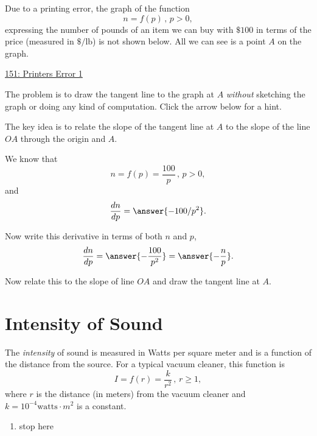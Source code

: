 \documentclass{ximera}
\begin{document}
\begin{question} \label{QGETGG3fg44}
Due to a printing error, the graph of the function
\[
      n = f(p)  \, , \, p>0 ,
\]
expressing the number of pounds of an item we can buy with $\$100$ in terms of the price (measured in $\$/\text{lb}$) is not shown below. All we can see is a point $A$ on the graph.

\begin{onlineOnly}
    \begin{center}
\end{center}
\end{onlineOnly}

\href{https://www.desmos.com/calculator/y5nqs8fkvj}{151: Printers Error 1}

The problem is to draw the tangent line to the graph at $A$ \emph{without} sketching the graph or doing any kind of computation. Click the arrow below for a hint.

\begin{expandable}
The key idea is to relate the slope of the tangent line at $A$ to the slope of the line $OA$ through the origin and $A$.


We know that
\[
      n = f(p)  = \frac{100}{p} \, , \, p>0 ,
\]
and
\[
 \frac{dn}{dp} =\answer{-100/p^2} .
\]

Now write this derivative in terms of both $n$ and $p$, 
\[
   \frac{dn}{dp} =\answer{-\frac{100}{p^2}} = \answer{-\frac{n}{p}} .
\]

Now relate this to the slope of line $OA$ and draw the tangent line at $A$.

\end{expandable}

\end{question}

\section{Intensity of Sound}

\begin{question}  \label{Qdfdgt446666}
The \emph{intensity} of sound is measured in Watts per square meter and is a function of the distance from the source. For a typical vacuum cleaner, this function is
\[
          I = f(r) = \frac{k}{r^2} \, , \, r\geq 1 ,
\]
where $r$ is the distance (in meters) from the vacuum cleaner and $k=10^{-4}\text{watts}\cdot m^2$ is a constant.

\begin{enumerate}
\item stop here
\end{enumerate}

\end{question}
\end{document}
